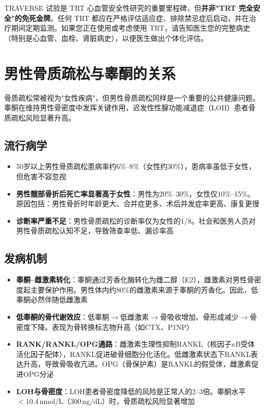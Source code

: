 \begin{tcolorbox}[colback=pink!5!white,colframe=red!50!black,title=贴心小叮咛]
TRAVERSE 试验是 TRT 心血管安全性研究的重要里程碑，但\textbf{并非"TRT 完全安全"的免死金牌}。任何 TRT 都应在严格评估适应症、排除禁忌症后启动，并在治疗期间定期监测。如果您正在使用或考虑使用 TRT，请告知医生您的完整病史（特别是心血管、血栓、肾脏病史），以便医生做出个体化评估。
\end{tcolorbox}

\section{男性骨质疏松与睾酮的关系}

骨质疏松常被视为"女性疾病"，但男性骨质疏松同样是一个重要的公共健康问题。睾酮在维持男性骨密度中发挥关键作用，迟发性性腺功能减退症（LOH）患者骨质疏松风险显著升高。

\subsection{流行病学}

\begin{itemize}[leftmargin=2cm]
	\item 50岁以上男性骨质疏松患病率约6\%--8\%（女性约30\%），患病率虽低于女性，但危害不容忽视
	\item \textbf{男性髋部骨折后死亡率显著高于女性}：男性为20\%--30\%，女性仅10\%--15\%。原因包括：男性骨折时年龄更大、合并症更多、术后并发症率更高、康复更慢
	\item \textbf{诊断率严重不足}：男性骨质疏松的诊断率仅为女性的1/8。社会和医务人员对男性骨质疏松认知不足，导致筛查率低、漏诊率高
\end{itemize}

\subsection{发病机制}

\begin{itemize}[leftmargin=2cm]
	\item \textbf{睾酮--雌激素转化}：睾酮通过芳香化酶转化为雌二醇（E2），雌激素对男性骨密度起主要保护作用。男性体内约80\%的雌激素来源于睾酮的芳香化。因此，低睾酮必然伴随低雌激素
	\item \textbf{低睾酮的骨代谢效应}：低睾酮$\rightarrow$低雌激素$\rightarrow$骨吸收增加、骨形成减少$\rightarrow$骨密度下降。表现为骨转换标志物升高（如CTX、P1NP）
	\item \textbf{RANK/RANKL/OPG通路}：雌激素生理性抑制RANKL（核因子$\kappa$B受体活化因子配体），RANKL促进破骨细胞分化活化。低雌激素状态下RANKL表达升高，导致骨吸收亢进。OPG（骨保护素）是RANKL的假受体，雌激素促进OPG分泌
	\item \textbf{LOH与骨密度}：LOH患者骨密度降低的风险是正常人的2--3倍。睾酮水平$<10.4\,$nmol/L（300\,ng/dL）时，骨质疏松风险显著增加
\end{itemize}

